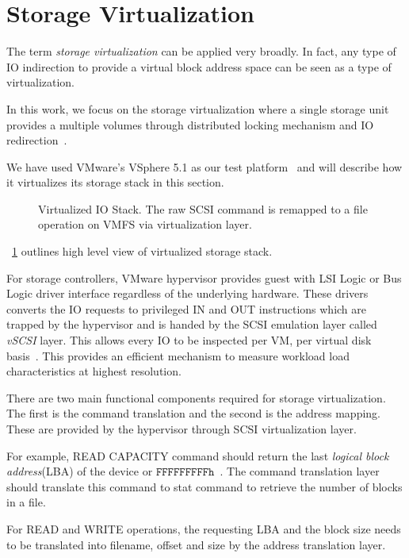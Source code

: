\section{Storage Virtualization}
\label{VIRT}

The term \emph{storage virtualization} can be applied very broadly. 
In fact, any type of IO indirection to provide a virtual block address space can be seen as a type of virtualization.

In this work, we focus on the storage virtualization where a single storage unit provides a multiple volumes through distributed locking mechanism and IO redirection~\cite{vaghani:2010, gupta:2011, soltis:1996}.

We have used VMware's VSphere 5.1 as our test platform~\cite{vmware:2013} and will describe how it virtualizes its storage stack in this section.

\begin{figure}[!t]
\centering

\captionsetup{format=myformat}
\caption{Virtualized IO Stack. The raw SCSI command is remapped to a file operation on VMFS via virtualization layer.}
\label{fig:vio}
\end{figure}

\figurename~\ref{fig:vio} outlines high level view of virtualized storage stack.

For storage controllers, VMware hypervisor provides guest with LSI Logic or Bus Logic driver interface regardless of the underlying hardware. 
These drivers converts the IO requests to privileged IN and OUT instructions which are trapped by the hypervisor and is handed by the SCSI emulation layer called \emph{vSCSI} layer. 
This allows every IO to be inspected per VM, per virtual disk basis~\cite{ahmad:2007}. 
This provides an efficient mechanism to measure workload load characteristics at highest resolution.  

There are two main functional components required for storage virtualization.
The first is the command translation and the second is the address mapping. 
These are provided by the hypervisor through SCSI virtualization layer.

For example, READ CAPACITY command should return the last \emph{logical block address}(LBA) of the device or $\mathtt{FFFFFFFFFh}$~\cite{seagate:2006}. 
The command translation layer should translate this command to stat command to retrieve the number of blocks in a file. 

For READ and WRITE operations, the requesting LBA and the block size needs to be translated into filename, offset and size by the address translation layer. 

